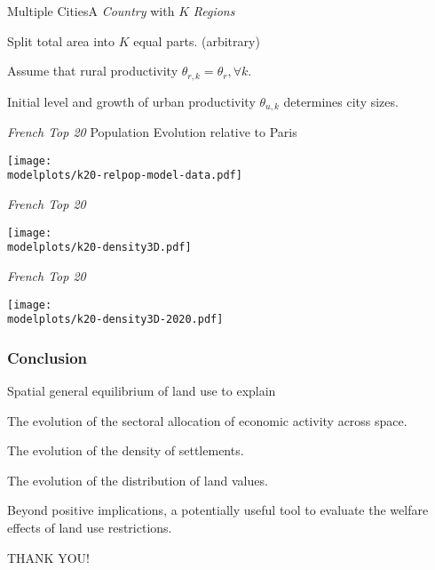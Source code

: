 \documentclass[aspectratio=169]{beamer}
\begin{document}
\begin{frame}{Multiple Cities}{A \emph{Country} with $K$ \emph{Regions}}
\begin{widei}
\item Split total area into $K$ equal parts. (arbitrary)
\item Assume that rural productivity $\theta_{r,k}=\theta_{r}, \forall k$.
\item Initial level and growth of urban productivity $\theta_{u,k}$ determines city sizes.

\end{widei}
\end{frame}

\begin{frame}{\emph{French Top 20} Population Evolution relative to Paris}

	\begin{adjustbox}{center}
		\texttt{[image: \\modelplots/k20-relpop-model-data.pdf]}
	\end{adjustbox}


\end{frame}

\begin{frame}{\emph{French Top 20}}

	\begin{adjustbox}{center}
		\texttt{[image: \\modelplots/k20-density3D.pdf]}
	\end{adjustbox}

\end{frame}

\begin{frame}{\emph{French Top 20}}

	\begin{adjustbox}{center}
		\texttt{[image: \\modelplots/k20-density3D-2020.pdf]}
	\end{adjustbox}

\end{frame}



\begin{frame}
\frametitle{Conclusion}

\bi
\item Spatial general equilibrium of land use to explain
\smallskip

\bi\item The evolution of the sectoral allocation of economic activity across space.
\smallskip
\item The evolution of the density of settlements.
\smallskip
\item The evolution of the distribution of land values.
\ei
\bigskip
\item Beyond positive implications, a potentially useful tool to evaluate the welfare effects of land use restrictions.\ei

\bigskip
\begin{center}
  THANK YOU!
\end{center}
\end{frame}
\end{document}
